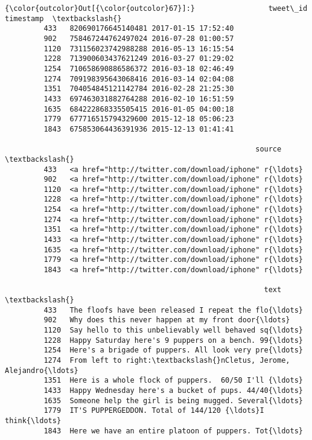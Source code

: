 \documentclass[11pt]{article}
\begin{document}
\begin{Verbatim}[commandchars=\\\{\}]
{\color{outcolor}Out[{\color{outcolor}67}]:}                 tweet\_id           timestamp  \textbackslash{}
         433   820690176645140481 2017-01-15 17:52:40   
         902   758467244762497024 2016-07-28 01:00:57   
         1120  731156023742988288 2016-05-13 16:15:54   
         1228  713900603437621249 2016-03-27 01:29:02   
         1254  710658690886586372 2016-03-18 02:46:49   
         1274  709198395643068416 2016-03-14 02:04:08   
         1351  704054845121142784 2016-02-28 21:25:30   
         1433  697463031882764288 2016-02-10 16:51:59   
         1635  684222868335505415 2016-01-05 04:00:18   
         1779  677716515794329600 2015-12-18 05:06:23   
         1843  675853064436391936 2015-12-13 01:41:41   
         
                                                          source  \textbackslash{}
         433   <a href="http://twitter.com/download/iphone" r{\ldots}   
         902   <a href="http://twitter.com/download/iphone" r{\ldots}   
         1120  <a href="http://twitter.com/download/iphone" r{\ldots}   
         1228  <a href="http://twitter.com/download/iphone" r{\ldots}   
         1254  <a href="http://twitter.com/download/iphone" r{\ldots}   
         1274  <a href="http://twitter.com/download/iphone" r{\ldots}   
         1351  <a href="http://twitter.com/download/iphone" r{\ldots}   
         1433  <a href="http://twitter.com/download/iphone" r{\ldots}   
         1635  <a href="http://twitter.com/download/iphone" r{\ldots}   
         1779  <a href="http://twitter.com/download/iphone" r{\ldots}   
         1843  <a href="http://twitter.com/download/iphone" r{\ldots}   
         
                                                            text  \textbackslash{}
         433   The floofs have been released I repeat the flo{\ldots}   
         902   Why does this never happen at my front door{\ldots}   
         1120  Say hello to this unbelievably well behaved sq{\ldots}   
         1228  Happy Saturday here's 9 puppers on a bench. 99{\ldots}   
         1254  Here's a brigade of puppers. All look very pre{\ldots}   
         1274  From left to right:\textbackslash{}nCletus, Jerome, Alejandro{\ldots}   
         1351  Here is a whole flock of puppers.  60/50 I'll {\ldots}   
         1433  Happy Wednesday here's a bucket of pups. 44/40{\ldots}   
         1635  Someone help the girl is being mugged. Several{\ldots}   
         1779  IT'S PUPPERGEDDON. Total of 144/120 {\ldots}I think{\ldots}   
         1843  Here we have an entire platoon of puppers. Tot{\ldots}   
         

\end{Verbatim}
\end{document}
